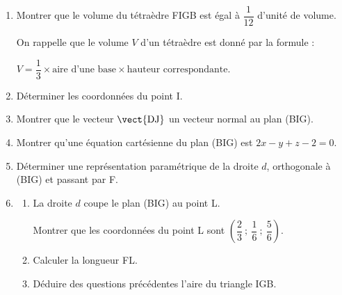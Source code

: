 \begin{enumerate}
\item Montrer que le volume du tétraèdre FIGB est égal à $\dfrac{1}{12}$ d'unité de volume. 

On rappelle que le volume $V$ d'un tétraèdre est donné par la formule :

\begin{center}$V = \dfrac13 \times \text{aire d'une base} \times  \text{hauteur correspondante}$.\end{center}
\item Déterminer les coordonnées du point I.
\item Montrer que le vecteur $\vect{\text{DJ}}$ un vecteur normal au plan (BIG).
\item Montrer qu'une équation cartésienne du plan (BIG) est $2x - y + z - 2 = 0$.
\item Déterminer une représentation paramétrique de la droite $d$, orthogonale à (BIG) et passant par F.
\item
	\begin{enumerate}
		\item La droite $d$ coupe le plan (BIG) au point L.
		
Montrer que les coordonnées du point L sont $\left(\dfrac23~;~\dfrac16~;~\dfrac56\right)$.
		\item Calculer la longueur FL.
		\item Déduire des questions précédentes l'aire du triangle IGB.
	\end{enumerate}
\end{enumerate}

\medskip
